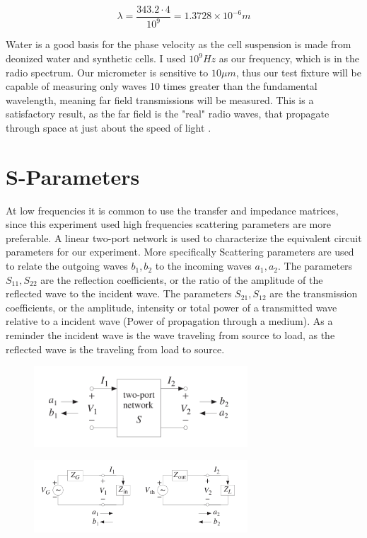 \documentclass[journal]{IEEEtran}
\begin{document}
\begin{equation}
\label{near-wavelength-water}
\lambda = \frac{343.2 \cdot 4}{10^9} = 1.3728 \times 10^{-6} m
\end{equation}

Water is a good basis for the phase velocity as the cell suspension is made from deonized water and synthetic cells. I used $10^9 Hz$ as our frequency, which is in the radio spectrum. Our micrometer is sensitive to $10\mu m$, thus our test fixture will be capable of measuring only waves 10 times greater than the fundamental wavelength, meaning far field transmissions will be measured. This is a satisfactory result, as the far field is the "real" radio waves, that propagate through space at just about the speed of light \cite{near-far-em}. 

\section{S-Parameters}
At low frequencies it is common to use the transfer and impedance matrices, since this experiment used high frequencies scattering parameters are more preferable. A linear two-port network is used to characterize the equivalent circuit parameters for our experiment. More specifically Scattering parameters are used to relate the outgoing waves $b_1,b_2$ to the incoming waves $a_1,a_2$. The parameters $S_{11},S_{22}$ are the reflection coefficients, or the ratio of the amplitude of the reflected wave to the incident wave. The parameters $S_{21},S_{12}$ are the transmission coefficients, or the amplitude, intensity or total power of a transmitted wave relative to a incident wave (Power of propagation through a medium). As a reminder the incident wave is the wave traveling from source to load, as the reflected wave is the traveling from load to source.

\begin{figure}[h]
\label{Equivalent_Circuit}
\includegraphics[width=8cm]{two_port.png}
\end{figure}

\begin{figure}[h]
\label{Equivalent_Circuit}
\includegraphics[width=8cm]{Equivalent_Circuit.png}
\end{figure}
\end{document}
